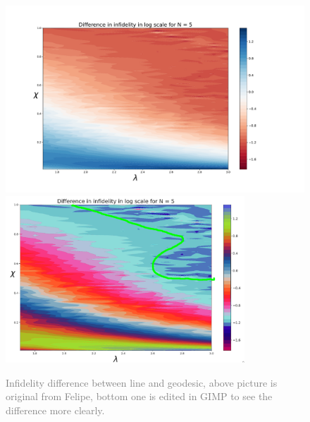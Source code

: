 \begin{figure}[H]
    \centering
    \includegraphics[width=1\textwidth]{../img/fidelity_lineVSgeodesic.pdf}
    \includegraphics[width=0.8\textwidth]{../img/fidelity_geodesicVSline_fuckedupcolors.png}
    \caption{\textcolor{gray}{Infidelity difference between line and geodesic, above picture is original from Felipe, bottom one is edited in GIMP to see the difference more clearly.}}
    \label{fig:higherStateManifolds}    
\end{figure}






